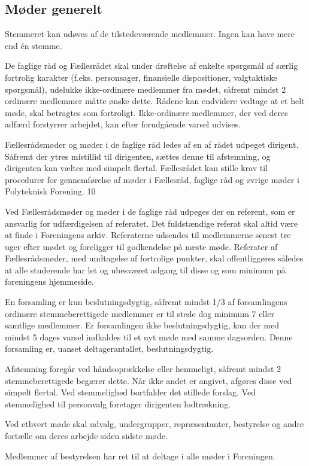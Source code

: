 \begin{list}
\subsection{Møder generelt}
\item  Stemmeret kan udøves af de tilstedeværende medlemmer. Ingen kan have mere end én stemme.
\item \label{s.30} De faglige råd og Fællesrådet skal under drøftelse af enkelte spørgsmål af særlig fortrolig karakter (f.eks.
              personsager, finansielle dispositioner, valgtaktiske spørgsmål), udelukke ikke-ordinære medlemmer fra
                mødet, såfremt mindst 2 ordinære medlemmer måtte ønske dette. Rådene kan endvidere vedtage at et helt
                     møde, skal betragtes som fortroligt.
                     Ikke-ordinære medlemmer, der ved deres adfærd forstyrrer arbejdet, kan efter forudgående varsel udvises.
\item  Fællesrådsmøder og møder i de faglige råd ledes af en af rådet udpeget dirigent. Såfremt der ytres mistillid til
              dirigenten, sættes denne til afstemning, og dirigenten kan væltes med simpelt flertal. Fællesrådet kan stille
                 krav til procedurer for gennemførelse af møder i Fællesråd, faglige råd og øvrige møder i Polyteknisk
                       Forening.
10
\item  Ved Fællesrådsmøder og møder i de faglige råd udpeges der en referent, som er ansvarlig for udfærdigelsen af referatet. Det fuldstændige referat skal altid være at finde i Foreningens arkiv. Referaterne udsendes til medlemmerne senest tre uger efter mødet og foreligger til godkendelse på næste møde. Referater af Fællesrådsmøder, med undtagelse af fortrolige punkter, skal offentliggøres således at alle studerende har let og ubesværet adgang til disse og som minimum på foreningens hjemmeside.

\item  En forsamling er kun beslutningsdygtig, såfremt mindst 1/3 af forsamlingens ordinære stemmeberettigede
         medlemmer er til stede dog minimum 7 eller samtlige medlemmer. Er forsamlingen ikke beslutningsdygtig,
        kan der med mindst 5 dages varsel indkaldes til et nyt møde med samme dagsorden. Denne forsamling er,
        uanset deltagerantallet, beslutningsdygtig.
\item  Afstemning foregår ved håndsoprækkelse eller hemmeligt, såfremt mindst 2 stemmeberettigede begærer
            dette. Når ikke andet er angivet, afgøres disse ved simpelt flertal. Ved stemmelighed bortfalder det stillede
             forslag. Ved stemmelighed til personvalg foretager dirigenten lodtrækning.
\item  Ved ethvert møde skal udvalg, undergrupper, repræsentanter, bestyrelse og andre fortælle om deres arbejde
          siden sidste møde.
\item  Medlemmer af bestyrelsen har ret til at deltage i alle møder i Foreningen.

\end{list}
